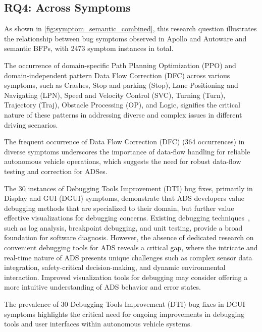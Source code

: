 \subsection{\textbf{RQ4: \BFPs Across Symptoms}}


As shown in \autoref{fig:symptom_semantic_combined}, this research question illustrates the relationship between bug symptoms observed in Apollo and Autoware and semantic BFPs, with 2473 symptom instances in total.


The occurrence of domain-specific \bfp Path Planning Optimization (PPO) and domain-independent pattern Data Flow Correction (DFC) across various symptoms, such as Crashes, Stop and parking (Stop), Lane Positioning and Navigating (LPN), Speed and Velocity Control (SVC), Turning (Turn), Trajectory (Traj), Obstacle Processing (OP), and Logic, signifies the critical nature of these patterns in addressing diverse and complex issues in different driving scenarios. 

\vspace{-1ex}
\begin{finding}
\label{finding:rq4_dfc}
    The frequent occurrence of Data Flow Correction (DFC) (364 occurrences) in diverse symptoms underscores the importance of data-flow handling for reliable autonomous vehicle operations, which suggests the need for robust data-flow testing and correction for ADSes.
\end{finding}
\vspace{-1ex}



The 30 instances of Debugging Tools Improvement (DTI) bug fixes, primarily in Display and GUI (DGUI) symptoms, demonstrate that ADS developers value debugging methods that are specialized to their domain, but further value effective visualizations for debugging concerns. 
Existing debugging techniques~\cite{ArcainiCILZAHV21,MINNERUP201644,apollo_debug,autoware_debug}, such as log analysis, breakpoint debugging, and unit testing, provide a broad foundation for software diagnosis. However, the absence of dedicated research on convenient debugging tools for ADS reveals a critical gap, where the intricate and real-time nature of ADS presents unique challenges such as complex sensor data integration, safety-critical decision-making, and dynamic environmental interaction. Improved visualization tools for debugging may consider offering a more intuitive understanding of ADS behavior and error states.

\vspace{-1ex}
\begin{finding}
\label{finding:rq4_dti}
    The prevalence of 30 Debugging Tools Improvement (DTI) bug fixes in DGUI symptoms highlights the critical need for ongoing improvements in debugging tools and user interfaces within autonomous vehicle systems. 
\end{finding}
\vspace{-1ex}

